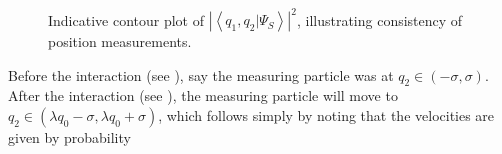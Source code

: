 \begin{figure}
\begin{centering}
~~ ~~
\par\end{centering}

\caption{Indicative contour plot of $\left|\left\langle q_{1},q_{2}|\Psi_{S}\right\rangle \right|^{2}$,
illustrating consistency of position measurements. }


%
%
\end{figure}
Before the interaction (see ),
say the measuring particle was at $q_{2}\in(-\sigma,\sigma)$. After
the interaction (see ), the
measuring particle will move to $q_{2}\in(\lambda q_{0}-\sigma,\lambda q_{0}+\sigma)$,
which follows simply by noting that the velocities are given by probability
